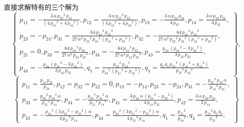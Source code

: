 直接求解特有的三个解为
\begin{equation}
\renewcommand{\arraystretch}{1.2}
\left\{
\begin{array}{l}
{{p}_{11}}=-\frac{3\,\alpha\,{{{p}_{22}}}^{2}\,{{p}_{41}}}{\left( 4\,{{{p}_{41}}}^{2}+4\,{{{p}_{42}}}^{2}\right) },
{{p}_{12}}=\frac{3\,\alpha\,{{{p}_{22}}}^{2}\,{{p}_{42}}}{\left( 4\,{{{p}_{41}}}^{2}+4\,{{{p}_{42}}}^{2}\right) },
{{p}_{13}}=-\frac{3\,\alpha\,{{p}_{22}}\,{{p}_{24}}}{4\,{{p}_{42}}},
{{p}_{14}}=\frac{3\,\alpha\,{{p}_{22}}\,{{p}_{24}}}{4\,{{p}_{42}}},\\ 
{{p}_{23}}=-{{p}_{24}},
{{p}_{31}}=\frac{64\,{{{p}_{41}}}^{3}\,{{{p}_{42}}}^{2}}{27\,{\alpha}^{2}\,{{{p}_{22}}}^{2}\,{{{p}_{24}}}^{2}\,\left( {{{p}_{41}}}^{2}+{{{p}_{42}}}^{2}\right) },
{{p}_{32}}=-\frac{64\,{{{p}_{41}}}^{2}\,{{{p}_{42}}}^{3}}{27\,{\alpha}^{2}\,{{{p}_{22}}}^{2}\,{{{p}_{24}}}^{2}\,\left( {{{p}_{41}}}^{2}+{{{p}_{42}}}^{2}\right) },\\ 
{{p}_{21}}=0,
{{p}_{33}}=\frac{64\,{{{p}_{41}}}^{2}\,{{p}_{42}}}{27\,{\alpha}^{2}\,{{p}_{24}}\,{{{p}_{22}}}^{3}},
{{p}_{34}}=-\frac{64\,{{{p}_{41}}}^{2}\,{{p}_{42}}}{27\,{\alpha}^{2}\,{{p}_{24}}\,{{{p}_{22}}}^{3}},
{{p}_{43}}=\frac{{{p}_{24}}\,\left( {{{p}_{41}}}^{2}-3\,{{{p}_{42}}}^{2}\right) }{3\,{{p}_{42}}\,{{p}_{22}}},\\ 
{{p}_{44}}=-\frac{{{p}_{24}}\,\left( {{{p}_{41}}}^{2}-3\,{{{p}_{42}}}^{2}\right) }{3\,{{p}_{42}}\,{{p}_{22}}},
{{q}_{1}}=\frac{{{{p}_{22}}}^{2}\,{{{p}_{42}}}^{2}}{{{{p}_{24}}}^{2}\,\left( {{{p}_{41}}}^{2}+{{{p}_{42}}}^{2}\right) },
{{q}_{4}}=\frac{{{q}_{2}}\,{{q}_{3}}\,{{{p}_{24}}}^{2}\,\left( {{{p}_{41}}}^{2}+{{{p}_{42}}}^{2}\right) }{{{{p}_{22}}}^{2}\,{{{p}_{42}}}^{2}}
\end{array}
\right\} ,
\end{equation}
\begin{equation}
\renewcommand{\arraystretch}{1.2}
\left\{
\begin{array}{l}
{{p}_{11}}=\frac{{{p}_{14}}\,{{p}_{21}}}{{{p}_{24}}},
p_{12}=p_{32}=p_{52}=0,
{{p}_{13}}=-{{p}_{14}},
{{p}_{23}}=-{{p}_{24}},
{{p}_{31}}=-\frac{{{{p}_{22}}}^{2}\,{{p}_{24}}\,\alpha}{{{{p}_{14}}}^{3}\,{{p}_{21}}},\\ 
{{p}_{33}}=\frac{{{{p}_{22}}}^{2}\,{{{p}_{24}}}^{2}\,\alpha}{{{{p}_{21}}}^{2}\,{{{p}_{14}}}^{3}},
{{p}_{34}}=-\frac{{{{p}_{22}}}^{2}\,{{{p}_{24}}}^{2}\,\alpha}{{{{p}_{21}}}^{2}\,{{{p}_{14}}}^{3}},
{{p}_{41}}=\frac{3\,{{p}_{24}}\,\alpha\,\left( {{{p}_{21}}}^{2}-{{{p}_{22}}}^{2}\right) }{4\,{{p}_{14}}\,{{p}_{21}}},
{{p}_{42}}=\frac{3\,\alpha\,{{p}_{22}}\,{{p}_{24}}}{2\,{{p}_{14}}},\\ 
{{p}_{43}}=-\frac{{{{p}_{24}}}^{2}\,\left( 3\,{{{p}_{21}}}^{2}-{{{p}_{22}}}^{2}\right) \,\alpha}{4\,{{{p}_{21}}}^{2}\,{{p}_{14}}},
{{p}_{44}}=\frac{{{{p}_{24}}}^{2}\,\left( 3\,{{{p}_{21}}}^{2}-{{{p}_{22}}}^{2}\right) \,\alpha}{4\,{{{p}_{21}}}^{2}\,{{p}_{14}}},
{{q}_{1}}=\frac{{{{p}_{21}}}^{2}}{{{{p}_{24}}}^{2}},
{{q}_{4}}=\frac{{{{p}_{24}}}^{2}\,{{q}_{2}}\,{{q}_{3}}}{{{{p}_{21}}}^{2}},
\end{array}
\right\}
\end{equation}
